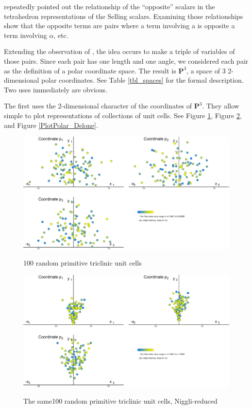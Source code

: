 \documentclass[preprint]{iucr}              %
\numberwithin{equation}{section}
\newcommand{\PIII}{\ensuremath{\mathbf{P}^{3}}}
\begin{document}
 repeatedly pointed out the relationship of the
``opposite'' scalars in the tetrahedron representations of the Selling
scalars. Examining those relationships show that the opposite terms 
are pairs where a term involving a is opposite a term involving $\alpha$, etc.

Extending the observation of , the idea occurs
to make a triple of variables of those pairs. Since each pair has
one length and one angle, we considered each pair as the definition of
a polar coordinate space. The result is \PIII{}, a space of 3 2-dimensional polar coordinates. See Table \ref{tbl_spaces} for the
formal description.  Two uses immediately are obvious.

The first uses the 2-dimensional character of the coordinates of \PIII{}. They
allow simple to plot representations of collections of unit cells. 
See Figure \ref{PlotPolar_raw}, Figure \ref{PlotPolar_Niggli}, and Figure \ref{PlotPolar_Delone}.

\begin{figure}
\includegraphics[width=\columnwidth]{PlotPolar_raw}
\label{PlotPolar_raw}
	\caption{100 random primitive triclinic unit cells}
\end{figure}

\begin{figure}
	\includegraphics[width=\columnwidth]{PlotPolar_Niggli}
	\label{PlotPolar_Niggli}
	\caption{The same100 random primitive triclinic unit cells, Niggli-reduced}
\end{figure}
\end{document}
